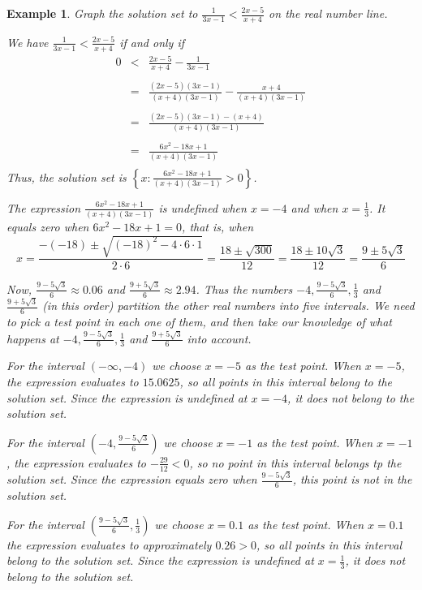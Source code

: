 \documentclass[11pt]{book}               %
\newtheorem{example}{Example}
\begin{document}
\begin{example}
Graph the solution set to $\frac{1}{3x-1} < \frac{2x - 5}{x + 4}$ on the real number line.

\normalfont
We have  $\frac{1}{3x-1} < \frac{2x - 5}{x + 4}$ if and only if 
$$
\begin{array}{rcl}
0 & < &  \frac{2x - 5}{x+ 4} - \frac{1}{3x-1}\\ \\
& = & \frac{(2x - 5)(3x-1)}{(x+ 4)(3x-1)} - \frac{x+4}{(x+4)(3x-1)}\\ \\
& = & \frac{(2x - 5)(3x-1) - (x+4)} {(x+4)(3x-1)}\\ \\
& = & \frac{6x^2 -18x + 1}{(x+4)(3x-1)}\\
\end{array}
$$
Thus, the solution set is $\left\{x:  \frac{6x^2 -18x + 1}{(x+4)(3x-1)} > 0\right\}$.

The expression $\frac{6x^2 -18x + 1}{(x+4)(3x-1)} $ is undefined when $x=-4$ and when $x = \frac{1}{3}$.
It equals zero when $6x^2 -18x + 1 = 0$, that is, when 
$$x = \frac{-(-18) \pm \sqrt{(-18)^2 - 4\cdot6\cdot1} } {2 \cdot 6} 
= \frac{18 \pm \sqrt{300}}{12}
= \frac{18 \pm 10\sqrt{3}}{12}
= \frac{9 \pm 5\sqrt{3}}{6}$$

Now, $\frac{9 - 5\sqrt{3}}{6} \approx 0.06$ and 
 $\frac{9 + 5\sqrt{3}}{6} \approx 2.94$.
 Thus the numbers $-4, \frac{9 - 5\sqrt{3}}{6}, \frac{1}{3}$ and $\frac{9 + 5\sqrt{3}}{6}$ (in this order)
 partition the other real numbers into five intervals.
 We need to pick a test point in each one of them, and then take our knowledge of what happens at 
  $-4, \frac{9 - 5\sqrt{3}}{6}, \frac{1}{3}$ and $\frac{9 + 5\sqrt{3}}{6}$ into account.
  
For the interval $(-\infty, -4)$ we choose $x = -5$ as the test point.  When $x = -5$, the expression evaluates to $15.0625$, so all points in this interval belong to the solution set.  Since the expression is undefined at $x = -4$, it does not belong to the solution set.

For the interval $(-4, \frac{9 - 5\sqrt{3}}{6})$ we choose $x=-1$ as the test point.
When $x = -1$, the expression evaluates to $-\frac{29}{12} < 0$, so no point in this interval belongs tp the solution set.  Since the expression equals zero when $\frac{9 - 5\sqrt{3}}{6}$, this point is not in the solution set.

For the interval $(\frac{9 - 5\sqrt{3}}{6}, \frac{1}{3})$ we choose $x = 0.1$ as the test point.
When $x = 0.1$ the expression evaluates to approximately $0.26 > 0$, so all points in this interval belong to the solution set.  Since the expression is undefined at $x = \frac{1}{3}$, it does not belong to the solution set.


\end{example}
\end{document}
